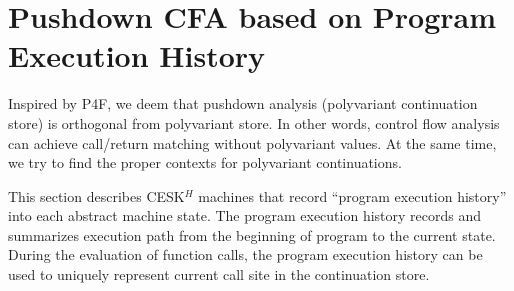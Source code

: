 \documentclass[12pt]{report}
\begin{document}
\chapter{Pushdown CFA based on Program Execution History}
\label{sec:hcfa}
Inspired by P4F, we deem that pushdown analysis (polyvariant continuation store) is orthogonal from polyvariant store. In other words, control flow analysis can achieve call/return matching without polyvariant values.
At the same time, we try to find the proper contexts for polyvariant continuations.

This section describes CESK$^H$ machines that record ``program execution history'' into each abstract machine state.
The program execution history records and summarizes execution path from the beginning of program to the current state.
During the evaluation of function calls, the program execution history can be used to uniquely represent current call site in the continuation store.
\end{document}
